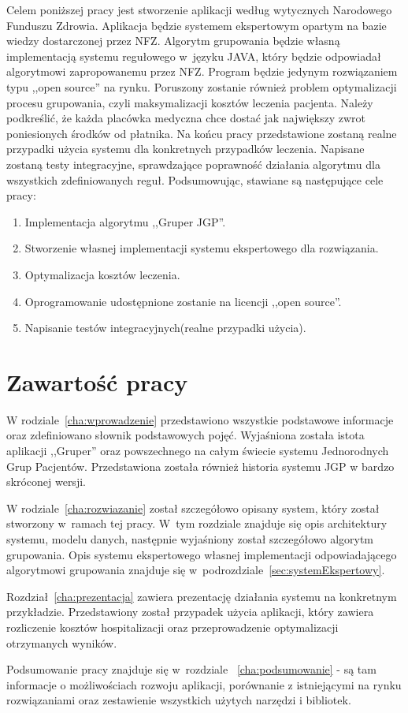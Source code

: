 Celem poniższej pracy jest stworzenie aplikacji według wytycznych Narodowego Funduszu Zdrowia\cite{plik_parametryzujacy}\cite{algorytm_grupera}. Aplikacja będzie systemem ekspertowym opartym na bazie wiedzy dostarczonej przez NFZ\cite{plik_parametryzujacy}. Algorytm grupowania będzie własną implementacją systemu regułowego w~języku JAVA, który będzie odpowiadał algorytmowi zapropowanemu przez NFZ\cite{algorytm_grupera}. Program będzie jedynym rozwiązaniem typu ,,open source'' na rynku. Poruszony zostanie również problem optymalizacji procesu grupowania, czyli maksymalizacji kosztów leczenia pacjenta. Należy podkreślić, że każda placówka medyczna chce dostać jak największy zwrot poniesionych środków od płatnika. Na końcu pracy przedstawione zostaną realne przypadki użycia systemu dla konkretnych przypadków leczenia. Napisane zostaną testy integracyjne, sprawdzające poprawność działania algorytmu dla wszystkich zdefiniowanych reguł. 
Podsumowując, stawiane są następujące cele pracy:
\begin{enumerate}
\item Implementacja algorytmu ,,Gruper JGP''.
\item Stworzenie własnej implementacji systemu ekspertowego dla rozwiązania.
\item Optymalizacja kosztów leczenia.
\item Oprogramowanie udostępnione zostanie na licencji ,,open source''.
\item Napisanie testów integracyjnych(realne przypadki użycia).
\end{enumerate}


\section{Zawartość pracy}
\label{sec:zawartoscPracy}

W rodziale~\ref{cha:wprowadzenie} przedstawiono wszystkie podstawowe informacje oraz zdefiniowano słownik podstawowych pojęć. Wyjaśniona została istota aplikacji ,,Gruper'' oraz powszechnego na całym świecie systemu Jednorodnych Grup Pacjentów. Przedstawiona została również historia systemu JGP w bardzo skróconej wersji.

W rodziale~\ref{cha:rozwiazanie} został szczegółowo opisany system, który został stworzony w~ramach tej pracy. W~tym rozdziale znajduje się opis architektury systemu, modelu danych, następnie wyjaśniony został szczegółowo algorytm grupowania. Opis systemu ekspertowego własnej implementacji odpowiadającego algorytmowi grupowania znajduje się w~podrozdziale~\ref{sec:systemEkspertowy}.

Rozdział~\ref{cha:prezentacja} zawiera prezentację działania systemu na konkretnym przykładzie. Przedstawiony został przypadek użycia aplikacji, który zawiera rozliczenie kosztów hospitalizacji oraz przeprowadzenie optymalizacji otrzymanych wyników.

Podsumowanie pracy znajduje się w~rozdziale ~\ref{cha:podsumowanie} - są tam informacje o możliwościach rozwoju aplikacji, porównanie z istniejącymi na rynku rozwiązaniami oraz zestawienie wszystkich użytych narzędzi i bibliotek.

